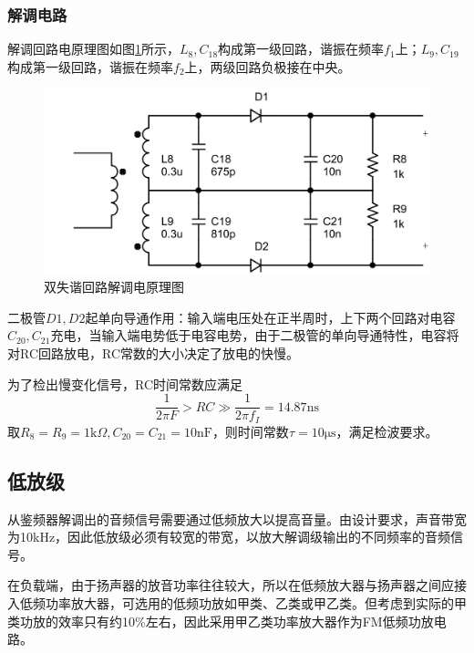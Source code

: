 \documentclass[a4paper,12pt,twoside]{article}
\begin{document}
\subsubsection{解调电路}



解调回路电原理图如图\ref{解调电原理}所示，$L_8,C_{18}$构成第一级回路，谐振在频率$f_1$上；$L_9,C_{19}$构成第一级回路，谐振在频率$f_2$上，两级回路负极接在中央。
\begin{figure}[H]
    \centering
    \includegraphics[scale=0.14]{解调电原理图.png}
    \caption{双失谐回路解调电原理图}
    \label{解调电原理}
\end{figure}

二极管$D1,D2$起单向导通作用：输入端电压处在正半周时，上下两个回路对电容$C_{20},C_{21}$充电，当输入端电势低于电容电势，由于二极管的单向导通特性，电容将对RC回路放电，RC常数的大小决定了放电的快慢。

为了检出慢变化信号，RC时间常数应满足
\begin{equation}
    \frac{1}{2\pi F}>RC\gg\frac{1}{2\pi f_{I}}=14.87\mathrm{ns}
    \label{21式}
\end{equation}
取$R_{8}=R_{9}=1\mathrm{k}\Omega,C_{20}=C_{21}=10\mathrm{nF}$，则时间常数$\tau = 10\mathrm{\mu s}$，满足检波要求。




\subsection{低放级}
从鉴频器解调出的音频信号需要通过低频放大以提高音量。由设计要求，声音带宽为10kHz，因此低放级必须有较宽的带宽，以放大解调级输出的不同频率的音频信号。

在负载端，由于扬声器的放音功率往往较大，所以在低频放大器与扬声器之间应接入低频功率放大器，可选用的低频功放如甲类、乙类或甲乙类。但考虑到实际的甲类功放的效率只有约10\%左右，因此采用甲乙类功率放大器作为FM低频功放电路。
\end{document}

